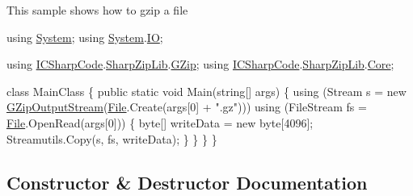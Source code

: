 This sample shows how to gzip a file 
\begin{DoxyCode}
\textcolor{keyword}{using} \hyperlink{namespace_system}{System};
\textcolor{keyword}{using} \hyperlink{namespace_system}{System}.\hyperlink{namespace_system_1_1_i_o}{IO};

\textcolor{keyword}{using} \hyperlink{namespace_i_c_sharp_code}{ICSharpCode}.\hyperlink{namespace_i_c_sharp_code_1_1_sharp_zip_lib}{SharpZipLib}.\hyperlink{namespace_i_c_sharp_code_1_1_sharp_zip_lib_1_1_g_zip}{GZip};
\textcolor{keyword}{using} \hyperlink{namespace_i_c_sharp_code}{ICSharpCode}.\hyperlink{namespace_i_c_sharp_code_1_1_sharp_zip_lib}{SharpZipLib}.\hyperlink{namespace_i_c_sharp_code_1_1_sharp_zip_lib_1_1_core}{Core};

\textcolor{keyword}{class }MainClass
\{
    \textcolor{keyword}{public} \textcolor{keyword}{static} \textcolor{keywordtype}{void} Main(\textcolor{keywordtype}{string}[] args)
    \{
            \textcolor{keyword}{using} (Stream s = \textcolor{keyword}{new} \hyperlink{class_i_c_sharp_code_1_1_sharp_zip_lib_1_1_g_zip_1_1_g_zip_output_stream_a8de4b46c4dd775a076c373ab46faabd8}{GZipOutputStream}(\hyperlink{namespace_lerp2_a_p_i_1_1_utility_af5d628470963cc0f18c37055b4170bf1a0b27918290ff5323bea1e3b78a9cf04e}{File}.Create(args[0] + \textcolor{stringliteral}{".gz"})))
            \textcolor{keyword}{using} (FileStream fs = \hyperlink{namespace_lerp2_a_p_i_1_1_utility_af5d628470963cc0f18c37055b4170bf1a0b27918290ff5323bea1e3b78a9cf04e}{File}.OpenRead(args[0])) \{
                byte[] writeData = \textcolor{keyword}{new} byte[4096];
                Streamutils.Copy(s, fs, writeData);
            \}
        \}
    \}
\}   
\end{DoxyCode}
 

\subsection{Constructor \& Destructor Documentation}
\mbox{\label{class_i_c_sharp_code_1_1_sharp_zip_lib_1_1_g_zip_1_1_g_zip_output_stream_a8de4b46c4dd775a076c373ab46faabd8}} 
